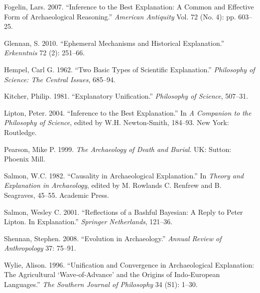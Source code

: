 \documentclass[10pt]{article}
\begin{document}
Fogelin, Lars. 2007. ``Inference to the Best Explanation: A Common and
Effective Form of Archaeological Reasoning.'' \emph{American Antiquity}
Vol. 72 (No. 4): pp. 603--25.

Glennan, S. 2010. ``Ephemeral Mechanisms and Historical Explanation.''
\emph{Erkenntnis} 72 (2): 251--66.

Hempel, Carl G. 1962. ``Two Basic Types of Scientific Explanation.''
\emph{Philosophy of Science: The Central Issues}, 685--94.

Kitcher, Philip. 1981. ``Explanatory Unification.'' \emph{Philosophy of
Science}, 507--31.

Lipton, Peter. 2004. ``Inference to the Best Explanation.'' In \emph{A
Companion to the Philosophy of Science}, edited by W.H. Newton-Smith,
184--93. New York: Routledge.

Pearson, Mike P. 1999. \emph{The Archaeology of Death and Burial}. UK:
Sutton: Phoenix Mill.

Salmon, W.C. 1982. ``Causality in Archaeological Explanation.'' In
\emph{Theory and Explanation in Archaeology}, edited by M. Rowlands C.
Renfrew and B. Seagraves, 45--55. Academic Press.

Salmon, Wesley C. 2001. ``Reflections of a Bashful Bayesian: A Reply to
Peter Lipton. In Explanation.'' \emph{Springer Netherlands}, 121--36.

Shennan, Stephen. 2008. ``Evolution in Archaeology.'' \emph{Annual
Review of Anthropology} 37: 75--91.

Wylie, Alison. 1996. ``Unification and Convergence in Archaeological
Explanation: The Agricultural `Wave‐of‐Advance' and the Origins of
Indo‐European Languages.'' \emph{The Southern Journal of Philosophy} 34
(S1): 1--30.
\end{document}
